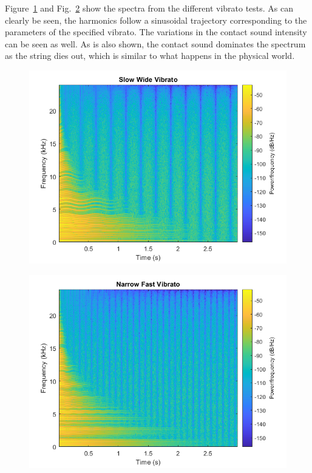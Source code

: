 \documentclass[../main.tex]{subfiles}
\begin{document}
Figure~\ref{fig:VibratoWideSpec} and Fig.~\ref{fig:VibratoNarrowSpec} show the spectra from the different vibrato tests. As can clearly be seen, the harmonics follow a sinusoidal trajectory corresponding to the parameters of the specified vibrato. The variations in the contact sound intensity can be seen as well. As is also shown, the contact sound dominates the spectrum as the string dies out, which is similar to what happens in the physical world.

\begin{figure}[h!]
    \centering
    \includegraphics[scale=.65]{./images/plots/VibratoWideSpec.png}
    \caption{}
    \label{fig:VibratoWideSpec}
\end{figure}

\begin{figure}[h!]
    \centering
    \includegraphics[scale=.65]{./images/plots/VibratoNarrowSpec.png}
    \caption{}
    \label{fig:VibratoNarrowSpec}
\end{figure}
\end{document}
